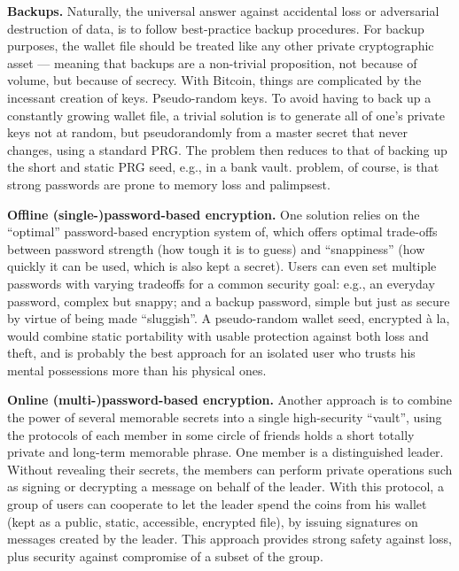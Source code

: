 \textbf{Backups.} Naturally, the universal answer against accidental loss or adversarial destruction
of data, is to follow best-practice backup procedures. For backup purposes, the
wallet file should be treated like any other private cryptographic asset — meaning that
backups are a non-trivial proposition, not because of volume, but because of secrecy.
With Bitcoin, things are complicated by the incessant creation of keys.
Pseudo-random keys. To avoid having to back up a constantly growing wallet file,
a trivial solution is to generate all of one’s private keys not at random, but pseudorandomly
from a master secret that never changes, using a standard PRG. The problem
then reduces to that of backing up the short and static PRG seed, e.g., in a bank vault.
problem, of course, is that strong passwords are prone to memory loss and palimpsest\cite{luther2013cryptocurrencies}.

\textbf{Offline (single-)password-based encryption.} One solution relies on the “optimal”
password-based encryption system of, which offers optimal trade-offs between password
strength (how tough it is to guess) and “snappiness” (how quickly it can be used,
which is also kept a secret). Users can even set multiple passwords with varying tradeoffs
for a common security goal: e.g., an everyday password, complex but snappy; and
a backup password, simple but just as secure by virtue of being made “sluggish”. A
pseudo-random wallet seed, encrypted à la, would combine static portability with
usable protection against both loss and theft, and is probably the best approach for an
isolated user who trusts his mental possessions more than his physical ones\cite{luther2013cryptocurrencies}.

\textbf{Online (multi-)password-based encryption.} Another approach is to combine the power
of several memorable secrets into a single high-security “vault”, using the protocols of 
each member in some circle of friends holds a short totally private and long-term
memorable phrase. One member is a distinguished leader. Without revealing their secrets,
the members can perform private operations such as signing or decrypting a message
on behalf of the leader. With this protocol, a group of users can cooperate to let
the leader spend the coins from his wallet (kept as a public, static, accessible, encrypted
file), by issuing signatures on messages created by the leader. This approach provides
strong safety against loss, plus security against compromise of a subset of the group\cite{luther2013cryptocurrencies}.

